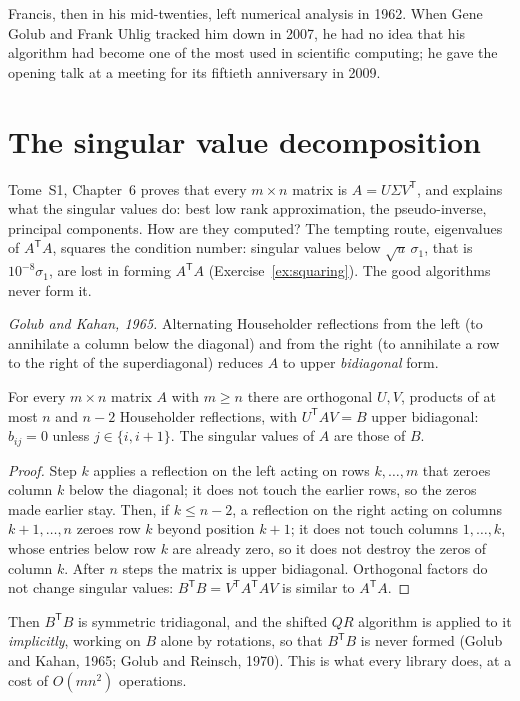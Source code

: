 Francis, then in his mid-twenties, left numerical analysis in 1962. When Gene Golub and Frank Uhlig tracked him down in 2007, he had no idea that his
algorithm had become one of the most used in scientific computing; he gave the opening talk at a meeting for its fiftieth anniversary in 2009.

\section{The singular value decomposition}\label{sec:svdcompute}

Tome~S1, Chapter~6 proves that every $m\times n$ matrix is $A=U\Sigma V^{\mathsf T}$, and explains what the singular values do: best low rank approximation,
the pseudo-inverse, principal components. How are they computed? The tempting route, eigenvalues of $A^{\mathsf T}A$, squares the condition number:
singular values below $\sqrt u\,\sigma_1$, that is $10^{-8}\sigma_1$, are lost in forming $A^{\mathsf T}A$ (Exercise~\ref{ex:squaring}). The good algorithms
never form it.

\emph{Golub and Kahan, 1965.} Alternating Householder reflections from the left (to annihilate a column below the diagonal) and from the right (to
annihilate a row to the right of the superdiagonal) reduces $A$ to upper \emph{bidiagonal} form.

\begin{proposition}[bidiagonalisation]\label{prop:bidiag}
For every $m\times n$ matrix $A$ with $m\ge n$ there are orthogonal $U,V$, products of at most $n$ and $n-2$ Householder reflections, with $U^{\mathsf T}AV=B$ upper
bidiagonal: $b_{ij}=0$ unless $j\in\{i,i+1\}$. The singular values of $A$ are those of $B$.
\end{proposition}
\begin{proof}
Step $k$ applies a reflection on the left acting on rows $k,\dots,m$ that zeroes column $k$ below the diagonal; it does not touch the earlier rows, so
the zeros made earlier stay. Then, if $k\le n-2$, a reflection on the right acting on columns $k+1,\dots,n$ zeroes row $k$ beyond position $k+1$; it does not
touch columns $1,\dots,k$, whose entries below row $k$ are already zero, so it does not destroy the zeros of column $k$. After $n$ steps the matrix is
upper bidiagonal. Orthogonal factors do not change singular values: $B^{\mathsf T}B=V^{\mathsf T}A^{\mathsf T}AV$ is similar to $A^{\mathsf T}A$.
\end{proof}

Then $B^{\mathsf T}B$ is symmetric tridiagonal, and the shifted $QR$ algorithm is applied to it \emph{implicitly}, working on $B$ alone by rotations,
so that $B^{\mathsf T}B$ is never formed (Golub and Kahan, 1965; Golub and Reinsch, 1970). This is what every library does, at a cost of
$O(mn^2)$ operations.

